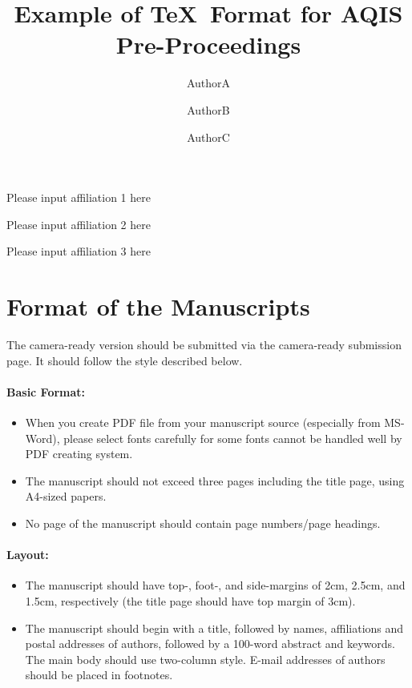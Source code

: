 \documentclass[a4paper]{article}
\begin{document}
\title{
   Example of \TeX\ Format for AQIS Pre-Proceedings
}

\author{
  AuthorA
  \and
 AuthorB
  \and
 AuthorC
  }
  
\address{1}{
  Please input affiliation 1 here
}
\address{2}{
  Please input affiliation 2 here
}
\address{3}{
  Please input affiliation 3 here
}





\maketitle


\section{Format of the Manuscripts}
The camera-ready version should be submitted
via the camera-ready submission page.
It should follow the style described below.

\paragraph{Basic Format:}

\begin{itemize}
  \item
      When you create PDF file from your manuscript source
      (especially from MS-Word), please select fonts carefully for
      some fonts cannot be handled well by PDF creating system.
  \item
    The manuscript should
    not exceed three pages including the title page,
    using A4-sized papers.
  \item
    No page of the manuscript should contain page numbers/page headings.
\end{itemize}

\paragraph{Layout:}

\begin{itemize}
  \item
    The manuscript should
    have top-, foot-, and side-margins of 2cm, 2.5cm, and 1.5cm,
    respectively (the title page should have top margin of 3cm).
  \item
    The manuscript should begin with a title,
    followed by names, affiliations and postal addresses of authors,
    followed by a 100-word abstract and keywords.
    The main body should use two-column style.
    E-mail addresses of authors should be placed in footnotes.
\end{itemize}
\end{document}
